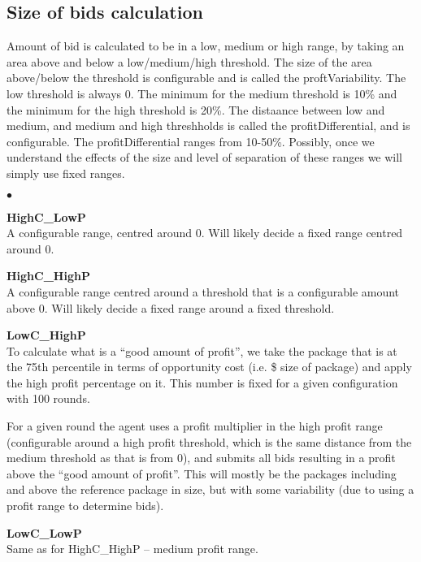\documentclass{article} %
\newenvironment{tightitemize}{
                \begin{list}{$\bullet$}{
                    \setlength{\itemsep}{-1pt}}{\setlength{\topsep}{0pt}}}{
                \end{list}}
\begin{document}
\subsection{Size of bids calculation}
Amount of bid is calculated to be in a low, medium or high range, by
taking an area above and below a low/medium/high threshold. The size
of the area above/below the threshold is configurable and is called
the proftVariability. The low threshold is always 0. The minimum for
the medium threshold is 10\% and the minimum for the high threshold is
20\%. The distaance between low and medium, and medium and high
threshholds is called the profitDifferential, and is configurable.
The profitDifferential ranges from 10-50\%. Possibly,
once we understand the effects of the size and level of separation of
these ranges we will simply use fixed ranges.
\begin{tightitemize}
\item {\bf HighC\_LowP}\\ %
A configurable range, centred around 0. Will likely decide a fixed
range centred around 0.
\item {\bf HighC\_HighP}\\ %
A configurable range centred around a threshold that is a configurable
amount above 0. Will likely decide a fixed range around a fixed threshold.
\item {\bf LowC\_HighP}\\  %
To calculate what is a \enquote{good amount of profit}, we take the package
that is at the 75th percentile in terms of opportunity cost (i.e. \$
size of package) and apply the high profit percentage on it. This number is 
fixed for a given configuration with 100 rounds.

For a given round the agent uses a profit multiplier in the high
profit range (configurable around a high profit threshold, which is
the same distance from the medium threshold as that is from 0), and
submits all bids resulting in a profit above the 
\enquote{good amount of profit}. This will mostly be the packages including
and above the reference package in size, but with some variability
(due to using a profit range to determine bids).
\item {\bf LowC\_LowP}\\ %
Same as for HighC\_HighP -- medium profit range.
\end{tightitemize}
\end{document}

